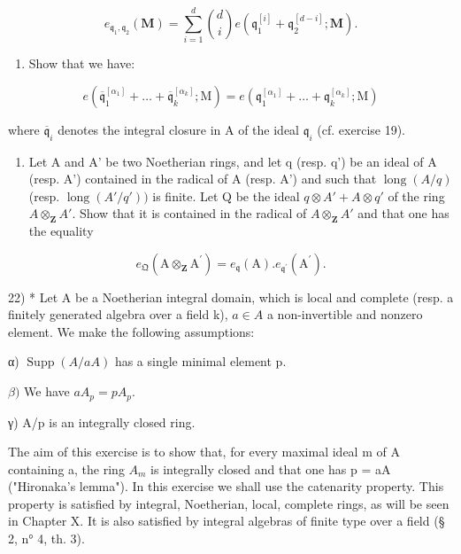 \[
e _ {\mathfrak {q} _ {1}, \mathfrak {q} _ {2}} (\mathbf {M}) = \sum_ {i = 1} ^ {d} \binom {d} {i} e (\mathfrak {q} _ {1} ^ {[ i ]} + \mathfrak {q} _ {2} ^ {[ d - i ]}; \mathbf {M}).
\]

\begin{enumerate}
\def\labelenumi{\alph{enumi})}
\setcounter{enumi}{5}
\tightlist
\item
  Show that we have:
\end{enumerate}

\[
e \left(\overline {{{\mathfrak {q}}}} _ {1} ^ {[ \alpha_ {1} ]} + \dots + \overline {{{\mathfrak {q}}}} _ {k} ^ {[ \alpha_ {k} ]}; \mathrm{M}\right) = e \left(\mathfrak {q} _ {1} ^ {[ \alpha_ {1} ]} + \dots + \mathfrak {q} _ {k} ^ {[ \alpha_ {k} ]}; \mathrm{M}\right)
\]

where \(\overline{\mathfrak{q}}_{i}\) denotes the integral closure in A of the ideal \(\mathfrak{q}_{i}\) (cf. exercise 19).

\begin{enumerate}
\def\labelenumi{\arabic{enumi})}
\setcounter{enumi}{20}
\tightlist
\item
  Let A and A' be two Noetherian rings, and let q (resp. q') be an ideal of A (resp. A') contained in the radical of A (resp. A') and such that \(\operatorname{long}(A/q)\) (resp. \(\operatorname{long}(A'/q'))\) is finite. Let Q be the ideal \(q \otimes A' + A \otimes q'\) of the ring \(A \otimes_{\mathbf{Z}} A'\). Show that it is contained in the radical of \(A \otimes_{\mathbf{Z}} A'\) and that one has the equality
\end{enumerate}

\[
e _ {\mathfrak {Q}} (\mathrm{A} \otimes_ {\mathbf {Z}} \mathrm{A} ^ {\prime}) = e _ {\mathfrak {q}} (\mathrm{A}). e _ {\mathfrak {q} ^ {\prime}} (\mathrm{A} ^ {\prime}).
\]

22) * Let A be a Noetherian integral domain, which is local and complete (resp. a finitely generated algebra over a field k), \(a \in A\) a non-invertible and nonzero element. We make the following assumptions:

α) \(\operatorname{Supp}(A/aA)\) has a single minimal element p.

\(\beta)\) We have \(aA_{p} = pA_{p}\).

γ) A/p is an integrally closed ring.

The aim of this exercise is to show that, for every maximal ideal m of A containing a, the ring \(A_{m}\) is integrally closed and that one has p = aA ("Hironaka's lemma"). In this exercise we shall use the catenarity property. This property is satisfied by integral, Noetherian, local, complete rings, as will be seen in Chapter X. It is also satisfied by integral algebras of finite type over a field (§ 2, n° 4, th. 3).

